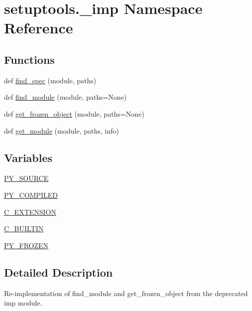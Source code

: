 \hypertarget{namespacesetuptools_1_1__imp}{}\section{setuptools.\+\_\+imp Namespace Reference}
\label{namespacesetuptools_1_1__imp}
\subsection*{Functions}
\begin{DoxyCompactItemize}
\item 
def \hyperlink{namespacesetuptools_1_1__imp_a0948fee2f0b613efbcfc70af9a16f646}{find\+\_\+spec} (module, paths)
\item 
def \hyperlink{namespacesetuptools_1_1__imp_aa220762980afbe3d3c2b7a54eab55472}{find\+\_\+module} (module, paths=None)
\item 
def \hyperlink{namespacesetuptools_1_1__imp_a3059e0b1d9667fd5c64fdc16e8fd156f}{get\+\_\+frozen\+\_\+object} (module, paths=None)
\item 
def \hyperlink{namespacesetuptools_1_1__imp_a8066804db6b3f28aa5a2a57c0f2510a2}{get\+\_\+module} (module, paths, info)
\end{DoxyCompactItemize}
\subsection*{Variables}
\begin{DoxyCompactItemize}
\item 
\hyperlink{namespacesetuptools_1_1__imp_a15ec64fcf574e876063a9bb1ac731b9e}{P\+Y\+\_\+\+S\+O\+U\+R\+CE}
\item 
\hyperlink{namespacesetuptools_1_1__imp_a58b9ff6b755e33d41992113b65a3b2ff}{P\+Y\+\_\+\+C\+O\+M\+P\+I\+L\+ED}
\item 
\hyperlink{namespacesetuptools_1_1__imp_a317ed5a01b4c8fc429616408417f6a28}{C\+\_\+\+E\+X\+T\+E\+N\+S\+I\+ON}
\item 
\hyperlink{namespacesetuptools_1_1__imp_a94b9a19c3d75483041f43d2c71c6460f}{C\+\_\+\+B\+U\+I\+L\+T\+IN}
\item 
\hyperlink{namespacesetuptools_1_1__imp_a69b314cc72da624c14728b349620effa}{P\+Y\+\_\+\+F\+R\+O\+Z\+EN}
\end{DoxyCompactItemize}


\subsection{Detailed Description}
\begin{DoxyVerb}Re-implementation of find_module and get_frozen_object
from the deprecated imp module.
\end{DoxyVerb}
 

